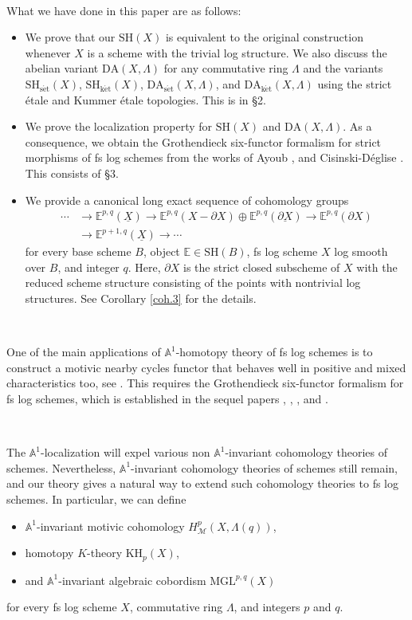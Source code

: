\documentclass[10pt]{amsart}
\theoremstyle{definition}
\theoremstyle{remark}
\numberwithin{equation}{subsection}
\newcommand{\A}{\mathbb{A}}
\newcommand{\E}{\mathbb{E}}
\newcommand{\cM}{\mathcal{M}}
\newcommand{\ul}{\underline}
\newcommand{\SH}{\mathrm{SH}}
\newcommand{\DA}{\mathrm{DA}}
\newcommand{\ketale}{\mathrm{k\acute{e}t}}
\newcommand{\setale}{\mathrm{s\acute{e}t}}
\begin{document}
\

What we have done in this paper are as follows:
\begin{itemize}
\item We prove that our $\SH(X)$ is equivalent to the original construction \cite[Definition 5.7]{zbMATH01194164} whenever $X$ is a scheme with the trivial log structure.
We also discuss the abelian variant $\DA(X,\Lambda)$  for any commutative ring $\Lambda$ and the variants $\SH_{\setale}(X)$, $\SH_{\ketale}(X)$, $\DA_{\setale}(X,\Lambda)$, and $\DA_{\ketale}(X,\Lambda)$ using the strict \'etale and Kummer \'etale topologies.
This is in \S 2.
\item We prove the localization property for $\SH(X)$ and $\DA(X,\Lambda)$.
As a consequence, we obtain the Grothendieck six-functor formalism for strict morphisms of fs log schemes from the works of Ayoub \cite{Ayo071},\cite{Ayo072} and Cisinski-D\'eglise \cite{CD19}.
This consists of \S 3.
\item We provide a canonical long exact sequence of cohomology groups
\begin{align*}
\cdots
&\to
\E^{p,q}(\ul{X})
\to
\E^{p,q}(X-\partial X)
\oplus
\E^{p,q}(\ul{\partial X})
\to
\E^{p,q}(\partial X)
\\
&\to
\E^{p+1,q}(\ul{X})
\to
\cdots
\end{align*}
for every base scheme $B$, object $\E\in \SH(B)$, fs log scheme $X$ log smooth over $B$, and integer $q$.
Here, $\partial X$ is the strict closed subscheme of $X$ with the reduced scheme structure consisting of the points with nontrivial log structures.
See Corollary \ref{coh.3} for the details.
\end{itemize}




\


One of the main applications of $\A^1$-homotopy theory of fs log schemes is to construct a motivic nearby cycles functor that behaves well in positive and mixed characteristics too,
see \cite[Theorems 1.1--1.4]{lognearby}.
This requires the Grothendieck six-functor formalism for fs log schemes,
which is established in the sequel papers \cite{divspc}, \cite{logGysin}, \cite{logshriek}, and \cite{logsix}.

\

The $\A^1$-localization will expel various non $\A^1$-invariant cohomology theories of schemes.
Nevertheless, $\A^1$-invariant cohomology theories of schemes still remain, and our theory gives a natural way to extend such cohomology theories to fs log schemes.
In particular, we can define
\begin{itemize}
\item $\A^1$-invariant motivic cohomology $H_{\cM}^{p}(X,\Lambda(q))$,
\item homotopy $K$-theory $\mathrm{KH}_p(X)$,
\item and $\A^1$-invariant algebraic cobordism $\mathrm{MGL}^{p,q}(X)$
\end{itemize}
for every fs log scheme $X$, commutative ring $\Lambda$, and integers $p$ and $q$.
\end{document}
